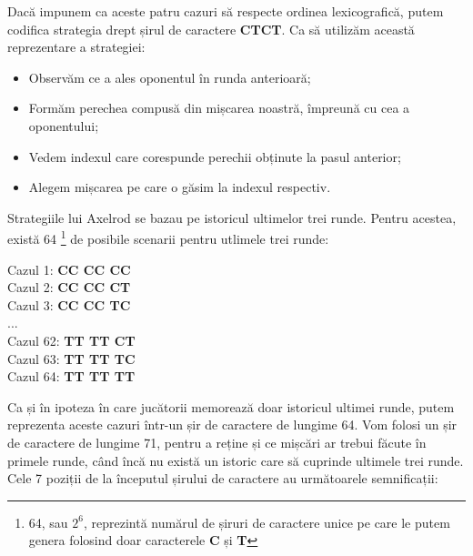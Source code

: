 Dacă impunem ca aceste patru cazuri să respecte ordinea lexicografică, putem codifica strategia drept șirul de caractere \textbf{CTCT}. Ca să utilizăm această reprezentare a strategiei:\\
\begin{itemize}
	\item Observăm ce a ales oponentul în runda anterioară;
	\item Formăm perechea compusă din mișcarea noastră, împreună cu cea a oponentului;
	\item Vedem indexul care corespunde perechii obținute la pasul anterior;
	\item Alegem mișcarea pe care o găsim la indexul respectiv.
\end{itemize}

Strategiile lui Axelrod se bazau pe istoricul ultimelor trei runde. Pentru acestea, există 64 \footnote{64, sau $2^6$, reprezintă numărul de șiruri de caractere unice pe care le putem genera folosind doar caracterele \textbf{C} și \textbf{T}} de posibile scenarii pentru utlimele trei runde: 

\begin{center}
	Cazul 1: \textbf{CC CC CC}\\
	Cazul 2: \textbf{CC CC CT}\\
	Cazul 3: \textbf{CC CC TC}\\
	...
	\\
	Cazul 62: \textbf{TT TT CT}\\
	Cazul 63: \textbf{TT TT TC}\\
	Cazul 64: \textbf{TT TT TT}\\
\end{center}

Ca și în  ipoteza în care jucătorii memorează doar istoricul ultimei runde, putem reprezenta aceste cazuri într-un șir de caractere de lungime 64. Vom folosi un șir de caractere de lungime 71, pentru a reține și ce mișcări ar trebui făcute în primele runde, când încă nu există un istoric care să cuprinde ultimele trei runde. Cele 7 poziții de la începutul șirului de caractere au următoarele semnificații:\\

